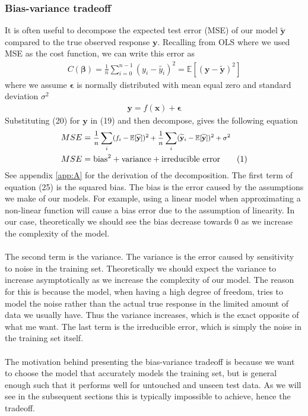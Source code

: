 \documentclass[a4paper,twocolumn]{article}
\newcommand\numberthis{\addtocounter{equation}{1}\tag{\theequation}}
\newcommand{\E}{\mathbb{E}}
\newcommand{\y}{\mathbf{y}}
\newcommand{\ytilde}{\mathbf{\widetilde{y}}}
\newcommand{\B}{\boldsymbol{\beta}}
\begin{document}
\subsubsection{Bias-variance tradeoff}
It is often useful to decompose the expected test error (MSE) of our model $\ytilde$ compared to the true observed response $\y$. Recalling from OLS where we used MSE as the cost function, we can write this error as
\begin{align}
    C(\B) = \frac{1}{n}\sum_{i=0}^{n-1}(y_{i} - \widetilde{y_{i}})^{2} = \E[(\y - \ytilde)^{2}]
\end{align}
where we assume $\mathbf{\epsilon}$ is normally distributed with mean equal zero and standard deviation $\sigma^{2}$
\begin{align}
    \y = f(\mathbf{x}) + \mathbf{\epsilon}
\end{align}
Substituting (20) for $\y$ in (19) and then decompose, gives the following equation
\begin{align*}
    \tiny
    MSE &= \text{\footnotesize$\frac{1}{n}\sum_{i}(f_{i} - \E[\ytilde])^{2} + \frac{1}{n}\sum_{i}(\ytilde_{i} - \E[\ytilde])^{2} + \sigma^{2}$}\\
    MSE &= \textrm{bias}^{2} + \textrm{variance} + \textrm{irreducible error} \numberthis\label{eqn}
\end{align*}
See appendix \autoref{app:A} for the derivation of the decomposition. The first term of equation (25) is the squared bias. The bias is the error caused by the assumptions we make of our models. For example, using a linear model when approximating a non-linear function will cause a bias error due to the assumption of linearity. In our case, theoretically we should see the bias decrease towards 0 as we increase the complexity of the model.\\
\\
The second term is the variance. The variance is the error caused by sensitivity to noise in the training set. Theoretically we should expect the variance to increase asymptotically as we increase the complexity of our model. The reason for this is because the model, when having a high degree of freedom, tries to model the noise rather than the actual true response in the limited amount of data we usually have. Thus the variance increases, which is the exact opposite of what me want. The last term is the irreducible error, which is simply the noise in the training set itself. \\
\\
The motivation behind presenting the bias-variance tradeoff is because we want to choose the model that accurately models the training set, but is general enough such that it performs well for untouched and unseen test data. As we will see in the subsequent sections this is typically impossible to achieve, hence the tradeoff. \\
\end{document}
